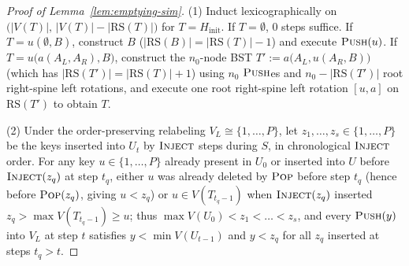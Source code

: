 \documentclass[11pt]{article}
\theoremstyle{definition}
\theoremstyle{remark}
\newcommand{\RS}{\mathrm{RS}}
\newcommand{\PUSH}{\textnormal{\scshape Push}}
\newcommand{\POP}{\textnormal{\scshape Pop}}
\newcommand{\INJECT}{\textnormal{\scshape Inject}}
\begin{document}
\begin{proof}[Proof of Lemma~\ref{lem:emptying-sim}]
(1) Induct lexicographically on $\big(|V(T)|,\, |V(T)| - |\RS(T)|\big)$ for $T = H_{\mathrm{init}}$. If $T = \emptyset$, $0$ steps suffice. If $T = u(\emptyset, B)$, construct $B$ ($|\RS(B)| = |\RS(T)| - 1$) and execute $\PUSH(u)$. If $T = u\big(a(A_L, A_R), B\big)$, construct the $n_0$-node BST $T' := a\big(A_L, u(A_R, B)\big)$ (which has $|\RS(T')| = |\RS(T)| + 1$) using $n_0$ $\PUSH$es and $n_0 - |\RS(T')|$ root right-spine left rotations, and execute one root right-spine left rotation $[u, a]$ on $\RS(T')$ to obtain $T$.

(2) Under the order-preserving relabeling $V_L \cong \{1, \dots, P\}$, let $z_1, \dots, z_s \in \{1, \dots, P\}$ be the keys inserted into $U_t$ by $\INJECT$ steps during $S$, in chronological $\INJECT$ order. For any key $u \in \{1, \dots, P\}$ already present in $U_0$ or inserted into $U$ before $\INJECT(z_q)$ at step $t_q$, either $u$ was already deleted by $\POP$ before step $t_q$ (hence before $\POP(z_q)$, giving $u < z_q$) or $u \in V(T_{t_q - 1})$ when $\INJECT(z_q)$ inserted $z_q > \max V(T_{t_q - 1}) \ge u$; thus $\max V(U_0) < z_1 < \dots < z_s$, and every $\PUSH(y)$ into $V_L$ at step $t$ satisfies $y < \min V(U_{t-1})$ and $y < z_q$ for all $z_q$ inserted at steps $t_q > t$.


\end{proof}
\end{document}
